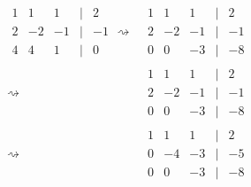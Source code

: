\documentclass{article}
\begin{document}
\begin{itemize}
\begin{align*}
    \begin{matrix}
      1 & 1 & 1 & | & 2 \\
      2 & -2 & -1 & | & -1 \\
      4 & 4 & 1 & | & 0
    \end{matrix}
    \rightsquigarrow
    &\begin{matrix}
      1 & 1 & 1 & | & 2 \\
      2 & -2 & -1 & | & -1 \\
      0 & 0& -3 & | & -8
    \end{matrix} \\
    \rightsquigarrow&
                      \begin{matrix}
                        1 & 1 & 1 & | & 2 \\
                        2 & -2 & -1 & | & -1 \\
                        0 & 0 & -3 & | & -8
                      \end{matrix} \\
    \rightsquigarrow&
                      \begin{matrix}
                        1 & 1 & 1 & | & 2 \\
                        0 & -4 & -3 & | & -5 \\
                        0 & 0 & -3 & | & -8
                      \end{matrix}
  \end{align*}
\end{itemize}
\end{document}
